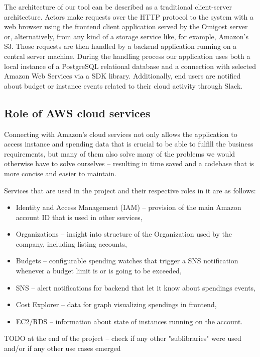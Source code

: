 \documentclass[licencjacka,en]{thesisclass}
\begin{document}
    The architecture of our tool can be described as a traditional client-server architecture.
    Actors make requests over the HTTP protocol to the system with a web browser using the frontend client application
    served by the Omigost server or, alternatively, from any kind of a storage service like, for example, Amazon's S3.
    Those requests are then handled by a backend application running on a central server machine.
    During the handling process our application uses both a local instance of a PostgreSQL relational database
    and a connection with selected Amazon Web Services via a SDK library.
    Additionally, end users are notified about budget or instance events related to their cloud activity through Slack.

    \subsection{Role of AWS cloud services}
    Connecting with Amazon's cloud services not only allows the application to access instance and spending data
    that is crucial to be able to fulfill the business requirements,
    but many of them also solve many of the problems we would otherwise have to solve ourselves -- resulting
    in time saved and a codebase that is more concise and easier to maintain.

    Services that are used in the project and their respective roles in it are as follows:
    \begin{itemize}
        \item Identity and Access Management (IAM) -- provision of the main Amazon account ID that is used in other services,
        \item Organizations -- insight into structure of the Organization used by the company, including listing accounts,
        \item Budgets -- configurable spending watches that trigger a SNS notification whenever a budget limit is or is going to be exceeded,
        \item SNS -- alert notifications for backend that let it know about spendings events,
        \item Cost Explorer -- data for graph visualizing spendings in frontend,
        \item EC2/RDS -- information about state of instances running on the account.
    \end{itemize}

    TODO at the end of the project -- check if any other "sublibraries" were used and/or if any other use cases emerged
\end{document}
